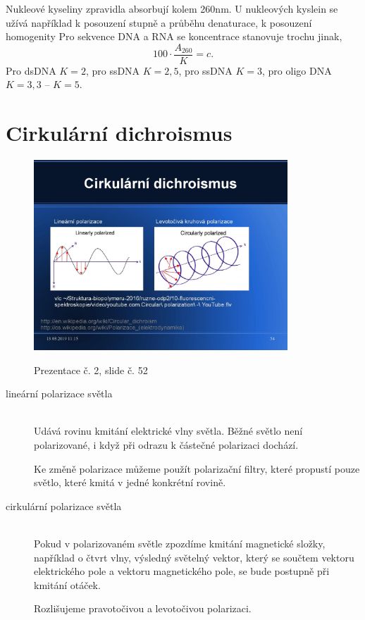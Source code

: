 \documentclass[DIV=8]{scrreprt}
\begin{document}
Nukleové kyseliny zpravidla absorbují kolem 260nm. U nukleových kyslein se užívá například k posouzení stupně a průběhu denaturace, k posouzení homogenity Pro sekvence DNA a RNA se koncentrace stanovuje trochu jinak,
\[100 \cdot \frac{A_{260}}{K} = c.\]
Pro dsDNA \(K = 2\), pro ssDNA \(K = 2,5\), pro ssDNA \(K = 3\), pro oligo DNA \(K = 3,3\) -- \(K = 5\).

\section{Cirkulární dichroismus} \label{Cirkulární dichroismus}


\begin{figure}
    \caption{Prezentace č. 2, slide č. 52}
    \includegraphics[width=0.85\textwidth]{slides-2/slide-52.jpg}
    \centering
    \label{slides-2-slide-52}
\end{figure}

\begin{description}
\item[lineární polarizace světla]\hfill \\
Udává rovinu kmitání elektrické vlny světla. Běžné světlo není polarizované, i když při odrazu k částečné polarizaci dochází.

Ke změně polarizace můžeme použít polarizační filtry, které propustí pouze světlo, které kmitá v jedné konkrétní rovině.


\item[cirkulární polarizace světla]\hfill \\
Pokud v polarizovaném světle zpozdíme kmitání magnetické složky, například o čtvrt vlny, výsledný světelný vektor, který se součtem vektoru elektrického pole a vektoru magnetického pole, se bude postupně při kmitání otáček.

Rozlišujeme pravotočivou a levotočivou polarizaci.

\end{description}
\end{document}
